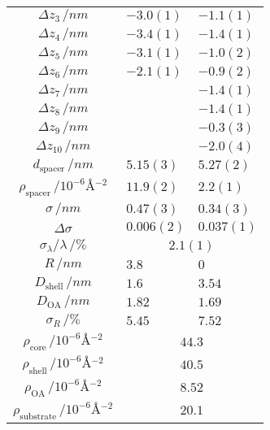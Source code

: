 \documentclass[\main/dresen_thesis.tex]{subfiles}
\begin{document}
\begin{table}[!htbp]
\begin{tabular}{ c | l | l }
       $\Delta z_3 \, / \unit{nm} $                                 & $-3.0(1)$        & $-1.1(1)$ \\
       $\Delta z_4 \, / \unit{nm} $                                 & $-3.4(1)$        & $-1.4(1)$ \\
       $\Delta z_5 \, / \unit{nm} $                                 & $-3.1(1)$        & $-1.0(2)$ \\
       $\Delta z_6 \, / \unit{nm} $                                 & $-2.1(1)$        & $-0.9(2)$ \\
       $\Delta z_7 \, / \unit{nm} $                                 &                  & $-1.4(1)$ \\
       $\Delta z_8 \, / \unit{nm} $                                 &                  & $-1.4(1)$   \\
       $\Delta z_9 \, / \unit{nm} $                                 &                  & $-0.3(3)$    \\
       $\Delta z_{10} \, / \unit{nm} $                              &                  & $-2.0(4)$   \\
       \hline
       $d_\mathrm{spacer}   \, / \unit{nm} $                        & $5.15(3)$         & $5.27(2)$  \\
       $\rho_\mathrm{spacer}\, / \unit{10^{-6} \angstrom^{-2}} $    & $11.9(2)$         & $2.2(1)$ \\
       $\sigma     \, / \unit{nm} $                                 & $0.47(3)$         & $0.34(3)$  \\
       $\Delta \sigma$                                              & $0.006(2)$        & $0.037(1)$ \\
       $\sigma_\lambda / \lambda\, / \unit{\%}$                     & \multicolumn{2}{c}{$2.1(1)$} \\
       \hline
       $R               \, / \unit{nm}$                               & $3.8$          & $0$ \\
       $D_\mathrm{shell}\, / \unit{nm}$                               & $1.6$          & $3.54$ \\
       $D_\mathrm{OA}   \, / \unit{nm}$                               & $1.82$         & $1.69$ \\
       $\sigma_R        \, / \unit{\%}$                               & $5.45$         & $7.52$ \\
       $\rho_\mathrm{core}\, / \unit{10^{-6} \angstrom^{-2}}      $ & \multicolumn{2}{c}{$44.3$}\\
       $\rho_\mathrm{shell}\, / \unit{10^{-6} \angstrom^{-2}}      $ & \multicolumn{2}{c}{$40.5$}\\
       $\rho_\mathrm{OA}\, / \unit{10^{-6} \angstrom^{-2}}     $ & \multicolumn{2}{c}{$8.52$}\\
       $\rho_\mathrm{substrate}\, / \unit{10^{-6} \angstrom^{-2}} $ & \multicolumn{2}{c}{$20.1$}\\
      \hline
    \end{tabular}
  \end{table}
\end{document}
